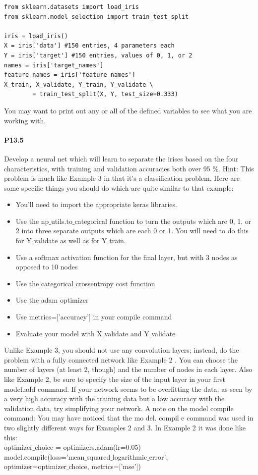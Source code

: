 \documentclass{book}
\theoremstyle{plain}
\theoremstyle{definition}
\numberwithin{exm}{chapter}
\theoremstyle{remark}
\theoremstyle{summary}
\theoremstyle{overview}
\begin{document}
\begin{lstlisting}
from sklearn.datasets import load_iris
from sklearn.model_selection import train_test_split

iris = load_iris()
X = iris['data'] #150 entries, 4 parameters each
Y = iris['target'] #150 entries, values of 0, 1, or 2
names = iris['target_names']
feature_names = iris['feature_names']
X_train, X_validate, Y_train, Y_validate \
		= train_test_split(X, Y, test_size=0.333)

\end{lstlisting}

You may want to print out any or all of the defined variables to see what you are
working with.

\paragraph*{P13.5} Develop a neural net which will learn to separate the irises based on the
four characteristics, with training and validation accuracies both over 95 $\%$.
Hint: This problem is much like Example 3 in that it's a classification problem. Here are some specific things you should do which are quite similar to that example:
\begin{itemize}
\item You\rq ll need to import the appropriate keras libraries.
\item Use the np$\_$utils.to$\_$categorical function to turn the outputs which
are 0, 1, or 2 into three separate outputs which are each 0 or 1. You will need
to do this for Y$\_$validate as well as for Y$\_$train.
\item Use a softmax activation function for the final layer, but with 3 nodes as
opposed to 10 nodes
\item Use the categorical$\_$crossentropy cost function
\item Use the adam optimizer
\item Use metrics=['accuracy'] in your compile command
\item  Evaluate your model with X$\_$validate and Y$\_$validate
\end{itemize}
Unlike Example 3, you should not use any convolution layers; instead, do the problem with a fully connected network like Example 2 . You can choose the number of layers (at least 2, though) and the number of nodes in each layer. Also like Example 2, be sure to specify the size of the input layer in your first model.add command. If your network seems to be overfitting the data, as seen by a very high accuracy with the training data but a low accuracy with the validation data, try simplifying your network.
A note on the model compile command: You may have noticed that the mo del. compil e command was used in two slightly different ways for Examples 2 and 3. In Example 2 it was done like this:\\
optimizer$\_$choice = optimizers.adam(lr=0.05)\\
model.compile(loss='mean$\_$squared$\_$logarithmic$\_$error',\\
optimizer=optimizer$\_$choice, metrics=['mse'])\\
\end{document}
